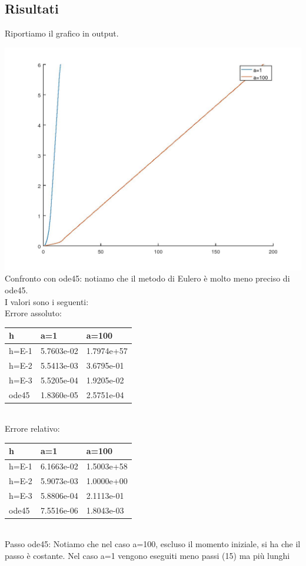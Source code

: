 \documentclass{article}
\begin{document}
	\subsection{Risultati}
	
	Riportiamo il grafico in output.
	
	\includegraphics[width=\textwidth]{2_6.jpeg}
	Confronto con ode45: notiamo che il metodo di Eulero è molto meno preciso di ode45. \\
	I valori sono i seguenti:\\
	Errore assoluto:\\
	\begin{tabular}{|l|l|l|}
		\hline
		 h & a=1 & a=100 \\ \hline
		h=E-1 & 5.7603e-02 & 1.7974e+57 \\ \hline
		h=E-2 & 5.5413e-03 & 3.6795e-01 \\ \hline
		h=E-3 & 5.5205e-04 & 1.9205e-02 \\ \hline
		ode45 & 1.8360e-05 & 2.5751e-04 \\ \hline
	\end{tabular}\\
	Errore relativo:\\
	\begin{tabular}{|l|l|l|}
		\hline
		h & a=1 & a=100 \\ \hline
		h=E-1 & 6.1663e-02 & 1.5003e+58 \\ \hline
		h=E-2 & 5.9073e-03 & 1.0000e+00 \\ \hline
		h=E-3 & 5.8806e-04 & 2.1113e-01 \\ \hline
		ode45 & 7.5516e-06 & 1.8043e-03 \\ \hline
	\end{tabular}
	\\
	Passo ode45: Notiamo che nel caso a=100, escluso il momento iniziale, si ha che il passo è costante. Nel caso a=1 vengono eseguiti meno passi (15) ma più lunghi

	
\end{document}
